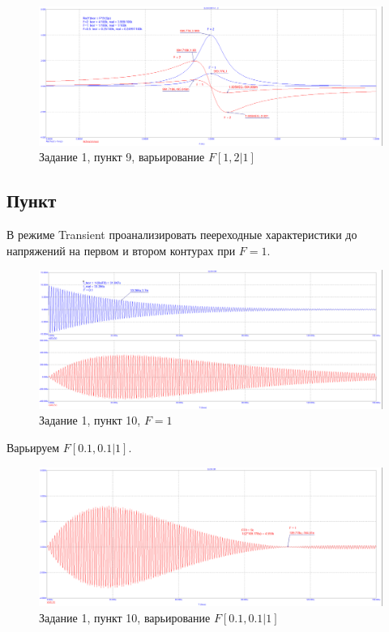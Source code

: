 \documentclass[a4paper, 14pt]{extarticle}%
\begin{document}
\begin{figure}[h!]
	\centering
			\includegraphics[width=1.1\linewidth]{908_work/9_2.png}
            \caption{Задание 1,  пункт 9, варьирование $F [1, 2|1]$}
	\label{A}
\end{figure}


\subsection{Пункт}

В режиме Transient проанализировать пеереходные характеристики до напряжений на первом и втором контурах при $ F  = 1$. 


\begin{figure}[h!]
	\centering
			\includegraphics[width=1.1\linewidth]{908_work/10_2.png}
            \caption{Задание 1,  пункт 10, $F = 1$}
	\label{A}
\end{figure}

Варьируем $F [0.1, 0.1|1]$. 

\begin{figure}[h!]
	\centering
			\includegraphics[width=1.1\linewidth]{908_work/10_3_f1.png}
            \caption{Задание 1,  пункт 10, варьирование $F [0.1, 0.1|1]$}
	\label{A}
\end{figure}
\end{document}
